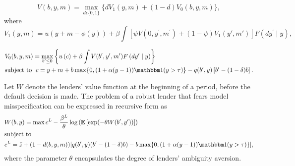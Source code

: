 \begin{equation}
V \left(b,y,m\right) =  \max_{d\epsilon\{0,1\}} \{d V_1(y,m) + (1-d)
V_0(b,y,m) \},\label{V}
\end{equation}
where
\begin{equation}
V_1(y,m)  =  u\left( y + m -  \phi \left( y\right) \right) + \beta \int
\left[ \psi V(0,y^{\prime },m^{\prime }) +\left( 1-\psi \right) V_1(y',m') \right]
F\left(dy^{\prime }\mid y\right), \label{V1}
\end{equation}

\begin{equation} \label{V0}
\begin{aligned}
&V_0(b,y,m)  =  \max_{b^{\prime } \leq 0} \left\{u\left(c \right) + \beta \int V(b^{\prime },y^{\prime },m^{\prime })F\left( dy^{\prime }\mid y\right) \right\} \\
&\text{subject to }\;
 c = y + m + b\max \{0,  (1+\alpha(y-1)) \ind (y > \tau) \} - q(b',y) \left[ b^{\prime } -  (1-\delta) b \right].
 \end{aligned}
\end{equation}

Let $W$ denote the lenders' value function at the beginning of a period, before the default decision is made. The problem of a robust lender that fears model misspecification can be expressed in recursive form as
\begin{equation} \label{eq:W}
      \begin{aligned}
	&W(b,y) = \max c^L - \frac{\beta^L}{\theta} \log \left( \mathbb{E}\left[ \exp(-\theta W(b',y')) \right] \right) \\
	&\text{subject to } \\
	&c^L = \bar{z} + (1-d(b,y,m)) [q(b',y)(b'-(1-\delta) b) - b\max \{0,  (1+\alpha(y-1)) \ind (y > \tau) \}],
	\end{aligned}
\end{equation}
where the parameter $\theta$ encapsulates the degree of lenders' ambiguity aversion.

